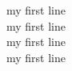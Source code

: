 \documentclass[12pt]{article}
\begin{document}
\noindent my first line\\
my first line\\
my first line\\
my first line\\
\end{document}
